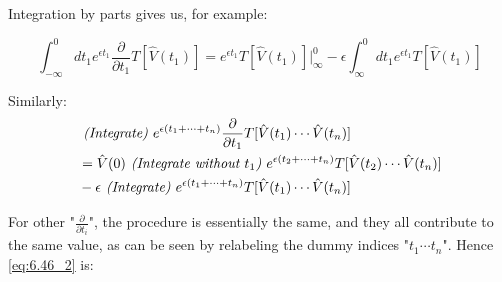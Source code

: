 \documentclass{article}
\numberwithin{equation}{subsection} %
\begin{document}
Integration by parts gives us, for example:

$$\int_{-\infty}^{0} dt_1 e^{\epsilon t_1} \frac{\partial}{\partial t_1} T[\hat{V}(t_1)] 
= 
e^{\epsilon t_1} T[\hat{V}(t_1)] \bigg|_{\infty}^0 - \epsilon\int_{\infty}^{0} dt_1 e^{\epsilon t_1}T[\hat{V}(t_1)]$$

Similarly:
\begin{align}
&\text{\textit{ (Integrate) }}
e^{\epsilon(t_1+\dotsb+t_n)}
\frac{\partial}{\partial t_1}
T[\hat{V}(t_1)\dotsb \hat{V}(t_n)] \nonumber \\
&= \hat{V}(0) \text{\textit{ (Integrate without $t_1$) }} 	e^{\epsilon(t_2+\dotsb+t_n)}
T[\hat{V}(t_2)\dotsb \hat{V}(t_n)] \nonumber \\
&- \epsilon \text{\textit{ (Integrate) }}
e^{\epsilon(t_1+\dotsb+t_n)}
T[\hat{V}(t_1)\dotsb \hat{V}(t_n)]
\end{align}

For other "$\frac{\partial}{\partial t_i}$", the procedure is essentially the same, and they all contribute to the same value, as can be seen by relabeling the dummy indices "$t_1 \dotsb t_n$". Hence \ref{eq:6.46_2} is:
\end{document}
